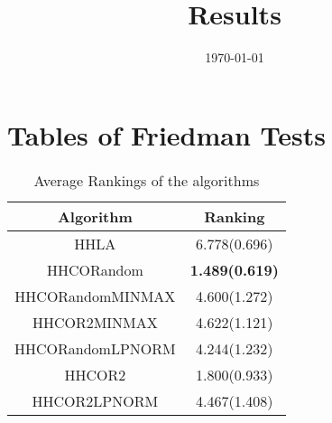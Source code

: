 \documentclass{article}
\title{Results}
\author{}
\date{\today}
\begin{document}
\oddsidemargin 0in \topmargin 0in\maketitle
\section{Tables of Friedman Tests}
\begin{table}[!htp]
\centering
\caption{Average Rankings of the algorithms
}\begin{tabular}{|c|c|}
\hline
Algorithm&Ranking\\
\hline
HHLA&6.778(0.696)\\\hline
HHCORandom& {\bf 1.489(0.619)}\\\hline
HHCORandomMINMAX&4.600(1.272)\\\hline
HHCOR2MINMAX&4.622(1.121)\\\hline
HHCORandomLPNORM&4.244(1.232)\\\hline
HHCOR2&1.800(0.933)\\\hline
HHCOR2LPNORM&4.467(1.408)\\\hline
\end{tabular}
\end{table}
\end{document}

